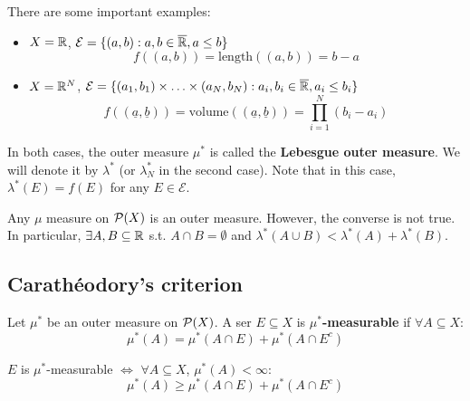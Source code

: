 \begin{fexample}
    There are some important examples:
    \vspace{1em}
    \begin{itemize}
        \item $X = \mathbb{R}$, $\mathcal{E} = \{(a, b): a,b \in \overline{\mathbb{R}}, a \leq b\}$
        $$f((a, b)) = \text{length}((a, b)) = b - a$$
        
        \vspace{1em}

        \item $X = \mathbb{R}^N$, $\mathcal{E} = \{(a_1, b_1) \times \ldots \times (a_N, b_N): a_i, b_i \in \overline{\mathbb{R}}, a_i \leq b_i\}$
        $$f((\underline{a}, \underline{b})) = \text{volume}((\underline{a}, \underline{b})) = \prod_{i=1}^{N} (b_i - a_i)$$
    \end{itemize}

    In both cases, the outer measure $\mu^{*}$ is called the \textbf{Lebesgue outer measure}. We
    will denote it by $\lambda^{*}$ (or $\lambda^{*}_N$ in the second case). Note that in this case,
    $\lambda^{*}(E) = f(E)$ for any $E \in \mathcal{E}$.
\end{fexample}

\begin{fremark}
    Any $\mu$ measure on $\mathcal{P}(X)$ is an outer measure. However, the converse is not true.
    In particular, $\exists A, B \subseteq \mathbb{R}$ s.t. $A \cap B = \emptyset$ and 
    $\lambda^{*}(A \cup B) < \lambda^{*}(A) + \lambda^{*}(B)$.
\end{fremark}

\subsection{Carathéodory's criterion}

\begin{fdefinition}
    Let $\mu^{*}$ be an outer measure on $\mathcal{P}(X)$. A ser $E \subseteq X$ is 
    \textbf{$\mu^{*}$-measurable} if $\forall A \subseteq X$:
    $$\mu^{*}(A) = \mu^{*}(A \cap E) + \mu^{*}(A \cap E^c)$$
\end{fdefinition}

\vspace{1em}

\begin{flemma}
    $E$ is $\mu^{*}$-measurable $\iff$ $\forall A \subseteq X$, $\mu^{*}(A) < \infty$:
    $$\mu^{*}(A) \geq \mu^{*}(A \cap E) + \mu^{*}(A \cap E^c)$$
\end{flemma}

